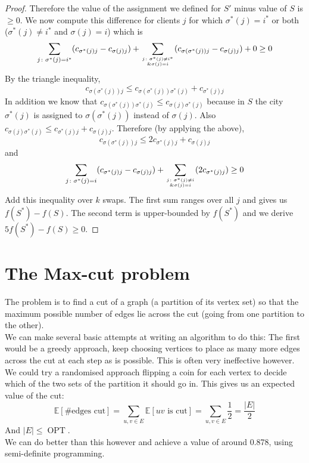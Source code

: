 \documentclass{article}
\theoremstyle{definition}
\newcommand{\bb}[1]{\mathbb{#1}}
\DeclareMathOperator{\OPT}{OPT}
\begin{document}
\begin{proof}
Therefore the value of the assignment we defined for $S'$ minus value of $S$ is $\ge 0$.
We now compute this difference for clients $j$ for which $\sigma^*(j) = i^*$ or both ($\sigma^*(j) \ne i^*$ and $\sigma(j) = i$) which is
$$\sum_{j\colon \sigma^*(j) = i^*} (c_{\sigma^*(j)j} - c_{\sigma(j)j}) + \sum_{j\colon \sigma^*(j) \ne i^* \atop \& \sigma(j) = i} (c_{\sigma(\sigma^*(j))j} - c_{\sigma(j)j}) + 0 \ge 0$$
By the triangle inequality, 
$$c_{\sigma(\sigma^*(j))j}\le c_{\sigma(\sigma^*(j))\sigma^*(j)} + c_{\sigma^*(j)j}$$
In addition we know that $c_{\sigma(\sigma^*(j))\sigma^*(j)}\le c_{\sigma(j)\sigma^*(j)}$ because in $S$ the city $\sigma^*(j)$ is assigned to $\sigma(\sigma^*(j))$ instead of $\sigma(j)$.
Also $c_{\sigma(j)\sigma^*(j)}\le c_{\sigma^*(j)j} + c_{\sigma(j)j}$.
Therefore (by applying the above),
$$c_{\sigma(\sigma^*(j))j}\le 2c_{\sigma^*(j)j}+c_{\sigma(j)j}$$
and
$$\sum_{j\colon \sigma^*(j)=i} (c_{\sigma^*(j)j} - c_{\sigma(j)j}) + \sum_{j\colon \sigma^*(j)\ne i \atop \& \sigma(j) = i} (2c_{\sigma^*(j)j})\ge 0$$
Add this inequality over $k$ swaps.
The first sum ranges over all $j$ and gives us $f(S^*) - f(S)$.
The second term is upper-bounded by $f(S^*)$ and we derive $5f(S^*) - f(S) \ge 0$.
\end{proof}


\section{The Max-cut problem}

The problem is to find a cut of a graph (a partition of its vertex set) so that the maximum possible number of edges lie across the cut (going from one partition to the other).\\
We can make several basic attempts at writing an algorithm to do this:
The first would be a greedy approach, keep choosing vertices to place as many more edges across the cut at each step as is possible.
This is often very ineffective however. \\
We could try a randomised approach flipping a coin for each vertex to decide which of the two sets of the partition it should go in.
This gives us an expected value of the cut:
$$\bb E[\#\text{edges cut}] = \sum_{u,v\in E}\bb E[uv\text{ is cut}] = \sum_{u,v\in E} \frac{1}{2} = \frac{|E|}{2}$$
And $|E|\le \OPT$. \\
We can do better than this however and achieve a value of around 0.878, using semi-definite programming.
\end{document}
